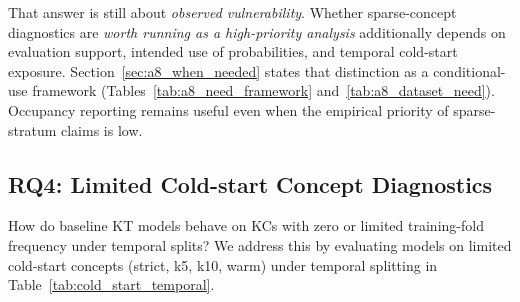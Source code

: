 That answer is still about \emph{observed vulnerability}. Whether sparse-concept diagnostics are \emph{worth running as a high-priority analysis} additionally depends on evaluation support, intended use of probabilities, and temporal cold-start exposure. Section~\ref{sec:a8_when_needed} states that distinction as a conditional-use framework (Tables~\ref{tab:a8_need_framework} and~\ref{tab:a8_dataset_need}). Occupancy reporting remains useful even when the empirical priority of sparse-stratum claims is low.

\subsection{RQ4: Limited Cold-start Concept Diagnostics}
\label{sec:rq4_coldstart}
How do baseline KT models behave on KCs with zero or limited training-fold frequency under temporal splits? We address this by evaluating models on limited cold-start concepts (strict, k5, k10, warm) under temporal splitting in Table~\ref{tab:cold_start_temporal}.


\FloatBarrier

